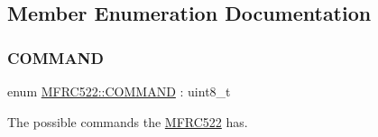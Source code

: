 \subsection{Member Enumeration Documentation}
\mbox{\label{class_m_f_r_c522_abf038692c9cf33ed59b44a612e6ed1c7}} 
\subsubsection{\texorpdfstring{C\+O\+M\+M\+A\+ND}{COMMAND}}
{\footnotesize\ttfamily enum \mbox{\hyperlink{class_m_f_r_c522_abf038692c9cf33ed59b44a612e6ed1c7}{M\+F\+R\+C522\+::\+C\+O\+M\+M\+A\+ND}} \+: uint8\+\_\+t}



The possible commands the \mbox{\hyperlink{class_m_f_r_c522}{M\+F\+R\+C522}} has. 

